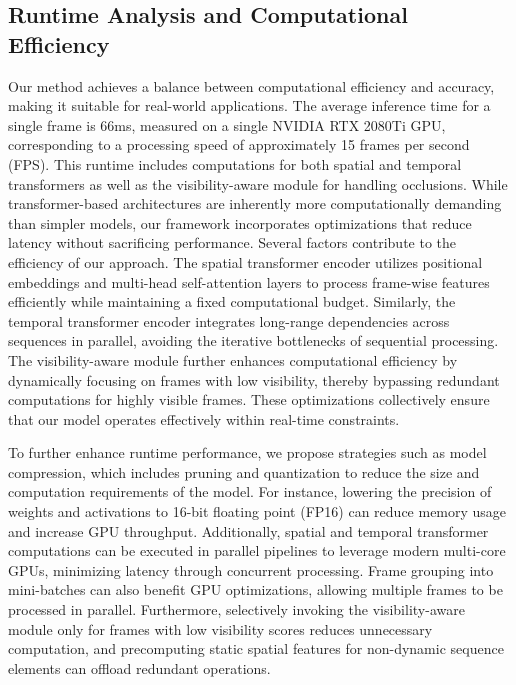\subsection{Runtime Analysis and Computational Efficiency}

Our method achieves a balance between computational efficiency and accuracy, making it suitable for real-world applications. The average inference time for a single frame is 66ms, measured on a single NVIDIA RTX 2080Ti GPU, corresponding to a processing speed of approximately 15 frames per second (FPS). This runtime includes computations for both spatial and temporal transformers as well as the visibility-aware module for handling occlusions. While transformer-based architectures are inherently more computationally demanding than simpler models, our framework incorporates optimizations that reduce latency without sacrificing performance. Several factors contribute to the efficiency of our approach. The spatial transformer encoder utilizes positional embeddings and multi-head self-attention layers to process frame-wise features efficiently while maintaining a fixed computational budget. Similarly, the temporal transformer encoder integrates long-range dependencies across sequences in parallel, avoiding the iterative bottlenecks of sequential processing. The visibility-aware module further enhances computational efficiency by dynamically focusing on frames with low visibility, thereby bypassing redundant computations for highly visible frames. These optimizations collectively ensure that our model operates effectively within real-time constraints.

To further enhance runtime performance, we propose strategies such as model compression, which includes pruning and quantization to reduce the size and computation requirements of the model. For instance, lowering the precision of weights and activations to 16-bit floating point (FP16) can reduce memory usage and increase GPU throughput. Additionally, spatial and temporal transformer computations can be executed in parallel pipelines to leverage modern multi-core GPUs, minimizing latency through concurrent processing. Frame grouping into mini-batches can also benefit GPU optimizations, allowing multiple frames to be processed in parallel. Furthermore, selectively invoking the visibility-aware module only for frames with low visibility scores reduces unnecessary computation, and precomputing static spatial features for non-dynamic sequence elements can offload redundant operations.

